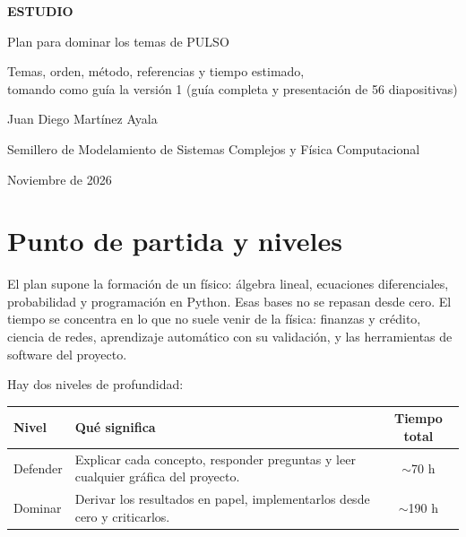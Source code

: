\documentclass[11pt,a4paper,oneside]{article}
\begin{document}
\begin{titlepage}
\centering
\vspace*{3.5cm}
{\sffamily\bfseries\Huge\color{azul} ESTUDIO\par}
\vspace{0.4cm}
{\sffamily\LARGE Plan para dominar los temas de PULSO\par}
\vspace{0.4cm}
{\large Temas, orden, método, referencias y tiempo estimado,\\
tomando como guía la versión 1 (guía completa y presentación de 56 diapositivas)\par}
\vfill
{\large Juan Diego Martínez Ayala\par}
{\normalsize Semillero de Modelamiento de Sistemas Complejos y Física Computacional\par}
\vspace{0.4cm}
{\normalsize Noviembre de 2026\par}
\end{titlepage}

\tableofcontents
\clearpage

\section{Punto de partida y niveles}

El plan supone la formación de un físico: álgebra lineal, ecuaciones diferenciales,
probabilidad y programación en Python. Esas bases no se repasan desde cero. El tiempo se
concentra en lo que no suele venir de la física: finanzas y crédito, ciencia de redes,
aprendizaje automático con su validación, y las herramientas de software del proyecto.

Hay dos niveles de profundidad:

\begin{center}
\begin{tabular}{p{}p{}c}
\toprule
\textbf{Nivel} & \textbf{Qué significa} & \textbf{Tiempo total} \\
\midrule
Defender & Explicar cada concepto, responder preguntas y leer cualquier gráfica del
proyecto. & $\sim$70 h \\
Dominar & Derivar los resultados en papel, implementarlos desde cero y criticarlos. &
$\sim$190 h \\
\bottomrule
\end{tabular}
\end{center}
\end{document}

